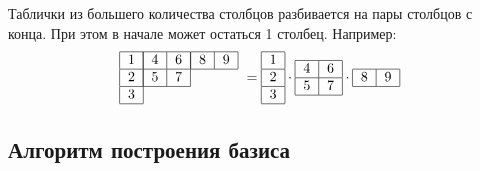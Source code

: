 \documentclass[]{article}
\renewcommand{\[}{\begin{equation}}
\renewcommand{\]}{\end{equation}}
\begin{document}
Таблички из большего количества столбцов разбивается на пары столбцов с конца. При этом в начале может остаться 1 столбец. Например:
$$
{
		\begin{tabular}{ | l | }
		\hline
		1 \\ \hline
		2 \\ \hline
		3 \\
		\hline
		\end{tabular}
	\kern -3.5pt
	\raise 6.2pt \hbox
	{
		\begin{tabular}{ |l|l| }
		\hline
		4 & 6 \\ \hline
		5 & 7\\
		\hline
		\end{tabular}
	}
	\kern -6.5pt
	\raise 12.4pt \hbox
	{
		\begin{tabular}{ |l|l| }
		\hline
		8 & 9 \\
		\hline
		\end{tabular}
	}
}
=
\begin{tabular}{ | l | }
\hline
1 \\ \hline
2 \\ \hline
3 \\
\hline
\end{tabular}
\cdot
\begin{tabular}{ |l|l| }
\hline
4 & 6 \\ \hline
5 & 7\\
\hline
\end{tabular}
\cdot
\begin{tabular}{ |l|l| }
\hline
8 & 9 \\
\hline
\end{tabular}
$$

\subsection{Алгоритм построения базиса}
\end{document}
